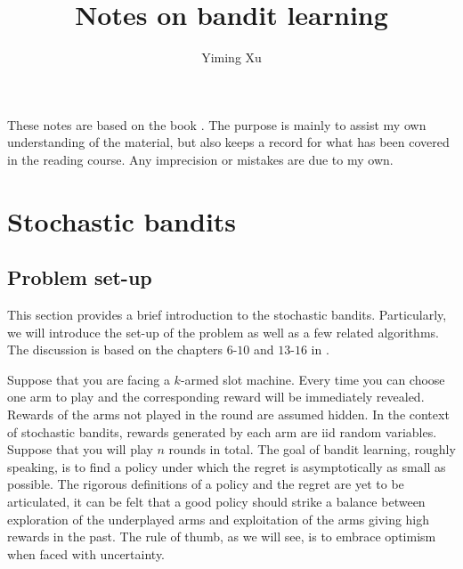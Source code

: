 \documentclass[10pt,a4article]{amsart}
\numberwithin{equation}{section}
\theoremstyle{plain}
\theoremstyle{definition}
\begin{document}
\title{\textbf{Notes on bandit learning}}
\date{}
\author{Yiming Xu}
\maketitle

These notes are based on the book \cite{lattimore2018bandit}. The purpose is mainly to assist my own understanding of the material, but also keeps a record for what has been covered in the reading course. Any imprecision or mistakes are due to my own. 

\bigskip

\bigskip

\bigskip

\tableofcontents
\newpage

\section{Stochastic bandits}\label{sec1}

\subsection{Problem set-up}

This section provides a brief introduction to the stochastic bandits. Particularly, we will introduce the set-up of the problem as well as a few related algorithms. The discussion is based on the chapters $6$-$10$ and $13$-$16$ in \cite{lattimore2018bandit}.

Suppose that you are facing a $k$-armed slot machine. Every time you can choose one arm to play and the corresponding reward will be immediately revealed. Rewards of the arms not played in the round are assumed hidden. In the context of stochastic bandits, rewards generated by each arm are iid random variables. Suppose that you will play $n$ rounds in total. The goal of bandit learning, roughly speaking, is to find a policy under which the regret is asymptotically as small as possible. The rigorous definitions of a policy and the regret are yet to be articulated, it can be felt that a good policy should strike a balance between exploration of the underplayed arms and exploitation of the arms giving high rewards in the past. The rule of thumb, as we will see, is to embrace optimism when faced with uncertainty. 
\end{document}
